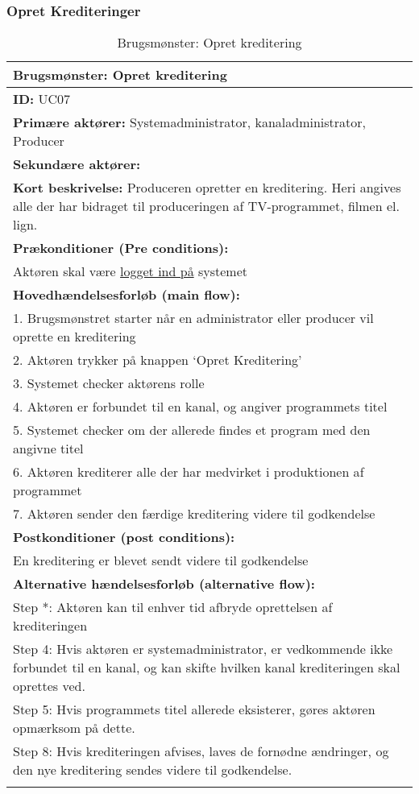 \subsubsection{Opret Krediteringer}
\begin{longtable}[h] {|p{16cm}|}
\hline
    \textbf{Brugsmønster:} Opret kreditering \\
    \hline
	\textbf{ID:} UC07 \\ \hline
	\textbf{Primære aktører:} Systemadministrator, kanaladministrator, Producer \\ \hline
	\textbf{Sekundære aktører:} \\ \hline
	\textbf{Kort beskrivelse:} Produceren opretter en kreditering. Heri angives alle der har bidraget til produceringen af TV-programmet, filmen el. lign. \\ \hline
	\textbf{Prækonditioner (Pre conditions):} \\
Aktøren skal være \hyperref[table:login]{logget ind på} systemet \\ \hline
\textbf{Hovedhændelsesforløb (main flow):} \\
	1. Brugsmønstret starter når en administrator eller producer vil oprette en kreditering \\
	2. Aktøren trykker på knappen ‘Opret Kreditering’ \\
	3. Systemet checker aktørens rolle \\
	4. Aktøren er forbundet til en kanal, og angiver programmets titel \\
	5. Systemet checker om der allerede findes et program med den angivne titel \\ 
	6. Aktøren krediterer alle der har medvirket i produktionen af programmet \\ 
	7. Aktøren sender den færdige kreditering videre til godkendelse \\ \hline
\textbf{Postkonditioner (post conditions):} \\ 
	En kreditering er blevet sendt videre til godkendelse \\ \hline
	\textbf{Alternative hændelsesforløb (alternative flow):} \\
Step *: Aktøren kan til enhver tid afbryde oprettelsen af krediteringen \\
Step 4: Hvis aktøren er systemadministrator, er vedkommende ikke forbundet til en kanal, og kan skifte hvilken kanal krediteringen skal oprettes ved. \\

Step 5: Hvis programmets titel allerede eksisterer, gøres aktøren opmærksom på dette. \\

Step 8: Hvis krediteringen afvises, laves de fornødne ændringer, og den nye kreditering sendes videre til godkendelse. \\
\hline
\caption{Brugsmønster: Opret kreditering}
\label{tab:create_credits}
\end{longtable}

